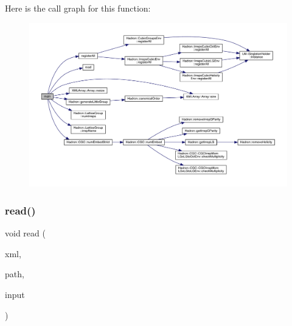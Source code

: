 Here is the call graph for this function\+:
\nopagebreak
\begin{figure}[H]
\begin{center}
\leavevmode
\includegraphics[width=350pt]{d1/d65/adat-devel_2main_2irreputils_2num__embed__table_8cc_a3c04138a5bfe5d72780bb7e82a18e627_cgraph}
\end{center}
\end{figure}
\mbox{\label{adat-devel_2main_2irreputils_2num__embed__table_8cc_a0bc6eab6ee4938b14f32a0a933d96dd9}} 
\subsubsection{\texorpdfstring{read()}{read()}}
{\footnotesize\ttfamily void read (\begin{DoxyParamCaption}\item[{X\+M\+L\+Reader \&}]{xml,  }\item[{const string \&}]{path,  }\item[{\mbox{\hyperlink{structtest__cgs__t}{test\+\_\+cgs\+\_\+t}} \&}]{input }\end{DoxyParamCaption})}

